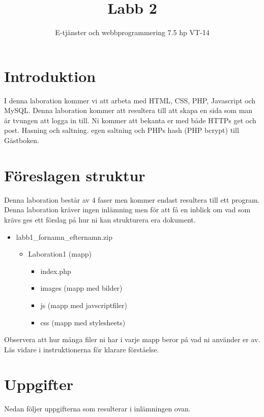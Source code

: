 \documentclass[12pt]{article}
\date{}
\title{ Labb 2 }
\author{ E-tjänster och webbprogrammering 7.5 hp VT-14 }
\begin{document}
\maketitle
\vspace{-2em}



\section{Introduktion}
I denna laboration kommer vi att arbeta med HTML, CSS, PHP, Javascript och MySQL. Denna laboration kommer att resultera till att skapa en sida som man är tvungen att logga in till. Ni kommer att bekanta er med både HTTPs get och post. Hasning och saltning. egen saltning och PHPs hash (PHP bcrypt) till Gästboken.

\section{Föreslagen struktur}
Denna laboration består av 4 faser men kommer endast resultera till ett program. Denna laboration kräver ingen inlämning men för att få en inblick om vad som krävs ges ett förslag på hur ni kan strukturera era dokument.
  \begin{itemize}
    \item labb1\_fornamn\_efternamn.zip
      \begin{itemize}
        \item Laboration1 (mapp)
          \begin{itemize}
            \item index.php 
            \item images (mapp med bilder)
            \item js (mapp med javscriptfiler)
	   \item css (mapp med stylesheets)
          \end{itemize}
    \end{itemize}
  \end{itemize}

Observera att hur många filer ni har i varje mapp beror på vad ni använder er av. Läs vidare i instruktionerna för klarare förståelse.


\pagebreak
\section{Uppgifter}
Nedan följer uppgifterna som resulterar i inlämningen ovan.
\end{document}
